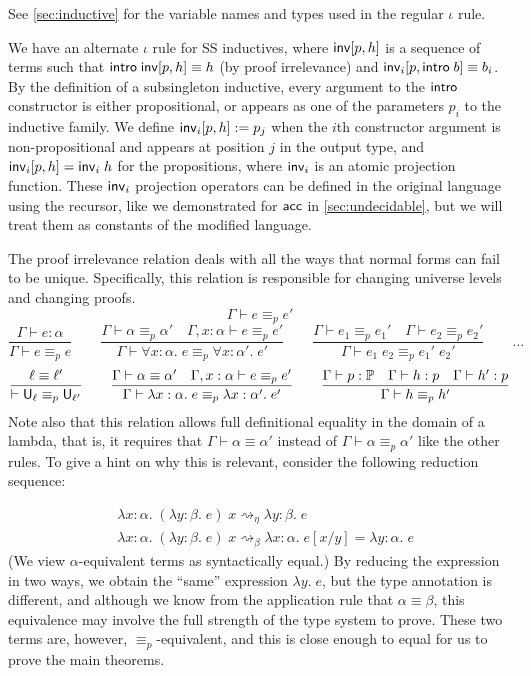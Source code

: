 See \autoref{sec:inductive} for the variable names and types used in the regular $\iota$ rule.

We have an alternate $\iota$ rule for SS inductives, where $\mathsf{inv}[p,h]$ is a sequence of terms such that $\mathsf{intro}\;\mathsf{inv}[p,h]\equiv h$ (by proof irrelevance) and $\mathsf{inv}_i[p,\mathsf{intro}\;b]\equiv b_i$. By the definition of a subsingleton inductive, every argument to the $\mathsf{intro}$ constructor is either propositional, or appears as one of the parameters $p_i$ to the inductive family. We define $\mathsf{inv}_i[p,h]:=p_j$ when the $i$th constructor argument is non-propositional and appears at position $j$ in the output type, and $\mathsf{inv}_i[p,h]=\mathsf{inv}_i\;h$ for the propositions, where $\mathsf{inv}_i$ is an atomic projection function. These $\mathsf{inv}_i$ projection operators can be defined in the original language using the recursor, like we demonstrated for $\mathsf{acc}$ in \autoref{sec:undecidable}, but we will treat them as constants of the modified language.

The proof irrelevance relation deals with all the ways that normal forms can fail to be unique. Specifically, this relation is responsible for changing universe levels and changing proofs.
$$\boxed{\Gamma\vdash e\equiv_p e'}$$
$$\frac{\Gamma\vdash e:\alpha}{\Gamma\vdash e\equiv_p e}\qquad
\frac{\Gamma\vdash\alpha\equiv_p\alpha'\quad \Gamma,x:\alpha\vdash e\equiv_p e'}{\Gamma\vdash \forall x:\alpha.\;e\equiv_p \forall x:\alpha'.\;e'}\qquad
\frac{\Gamma\vdash e_1\equiv_p e_1'\quad \Gamma\vdash e_2\equiv_p e_2'}{\Gamma\vdash e_1\;e_2\equiv_p e_1'\;e_2'}\qquad\dots$$
$$\frac{\ell\equiv\ell'}{\vdash \U_\ell\equiv_p\U_{\ell'}}\qquad
\frac{\Gamma\vdash\alpha\equiv\alpha'\quad \Gamma,x:\alpha\vdash e\equiv_p e'}{\Gamma\vdash \lambda x:\alpha.\;e\equiv_p \lambda x:\alpha'.\;e'}\qquad
\frac{\Gamma\vdash p:\P\quad \Gamma\vdash h:p\quad \Gamma\vdash h':p}{\Gamma \vdash h\equiv_p h'}$$
Note also that this relation allows full definitional equality in the domain of a lambda, that is, it requires that $\Gamma\vdash \alpha\equiv\alpha'$ instead of $\Gamma\vdash \alpha\equiv_p\alpha'$ like the other rules. To give a hint on why this is relevant, consider the following reduction sequence:

\begin{align*}
&\lambda x:\alpha.\;(\lambda y:\beta.\;e)\;x\rightsquigarrow_\eta\lambda y:\beta.\;e\\
&\lambda x:\alpha.\;(\lambda y:\beta.\;e)\;x\rightsquigarrow_\beta\lambda x:\alpha.\;e[x/y]=\lambda y:\alpha.\;e
\end{align*}
(We view $\alpha$-equivalent terms as syntactically equal.) By reducing the expression in two ways, we obtain the ``same'' expression $\lambda y.\;e$, but the type annotation is different, and although we know from the application rule that $\alpha\equiv\beta$, this equivalence may involve the full strength of the type system to prove. These two terms are, however, $\equiv_p$-equivalent, and this is close enough to equal for us to prove the main theorems.


